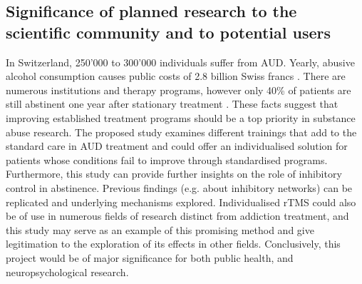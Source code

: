 \documentclass[12pt]{article}
\begin{document}
\subsection{Significance of planned research to the scientific community and to potential users}
In Switzerland, 250’000 to 300’000 individuals suffer from AUD. Yearly, abusive alcohol consumption causes public costs of 2.8 billion Swiss francs \parencite{AlkoholUndAlkoholpravention2021}. There are numerous institutions and therapy programs, however only 40\% of patients are still abstinent one year after stationary treatment \parencite{moggiSubstanceUseDisorder2007}. These facts suggest that improving established treatment programs should be a top priority in substance abuse research. The proposed study examines different trainings that add to the standard care in AUD treatment and could offer an individualised solution for patients whose conditions fail to improve through standardised programs. 
Furthermore, this study can provide further insights on the role of inhibitory control in abstinence. Previous findings (e.g. about inhibitory networks) can be replicated and underlying mechanisms explored.
Individualised rTMS could also be of use in numerous fields of research distinct from addiction treatment, and this study may serve as an example of this promising method and give legitimation to the exploration of its effects in other fields.
Conclusively, this project would be of major significance for both public health, and neuropsychological research.

\printbibliography  
\end{document}

